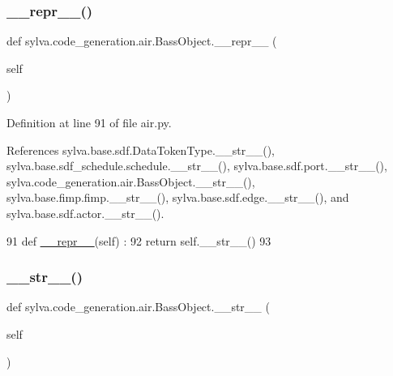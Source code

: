 \subsubsection{\texorpdfstring{\+\_\+\+\_\+repr\+\_\+\+\_\+()}{\_\_repr\_\_()}}
{\footnotesize\ttfamily def sylva.\+code\+\_\+generation.\+air.\+Bass\+Object.\+\_\+\+\_\+repr\+\_\+\+\_\+ (\begin{DoxyParamCaption}\item[{}]{self }\end{DoxyParamCaption})}



Definition at line 91 of file air.\+py.



References sylva.\+base.\+sdf.\+Data\+Token\+Type.\+\_\+\+\_\+str\+\_\+\+\_\+(), sylva.\+base.\+sdf\+\_\+schedule.\+schedule.\+\_\+\+\_\+str\+\_\+\+\_\+(), sylva.\+base.\+sdf.\+port.\+\_\+\+\_\+str\+\_\+\+\_\+(), sylva.\+code\+\_\+generation.\+air.\+Bass\+Object.\+\_\+\+\_\+str\+\_\+\+\_\+(), sylva.\+base.\+fimp.\+fimp.\+\_\+\+\_\+str\+\_\+\+\_\+(), sylva.\+base.\+sdf.\+edge.\+\_\+\+\_\+str\+\_\+\+\_\+(), and sylva.\+base.\+sdf.\+actor.\+\_\+\+\_\+str\+\_\+\+\_\+().


\begin{DoxyCode}
91   \textcolor{keyword}{def }\hyperlink{namespacesylva_1_1code__generation_1_1floorplanner_a84f24b1e40f5425e9bb40ab45ccbd10f}{\_\_repr\_\_}(self) :
92     \textcolor{keywordflow}{return} self.\_\_str\_\_()
93 
\end{DoxyCode}
\mbox{\label{classsylva_1_1code__generation_1_1air_1_1_bass_object_a2c164720220479369c29db97b67aabe8}} 
\subsubsection{\texorpdfstring{\+\_\+\+\_\+str\+\_\+\+\_\+()}{\_\_str\_\_()}}
{\footnotesize\ttfamily def sylva.\+code\+\_\+generation.\+air.\+Bass\+Object.\+\_\+\+\_\+str\+\_\+\+\_\+ (\begin{DoxyParamCaption}\item[{}]{self }\end{DoxyParamCaption})}



